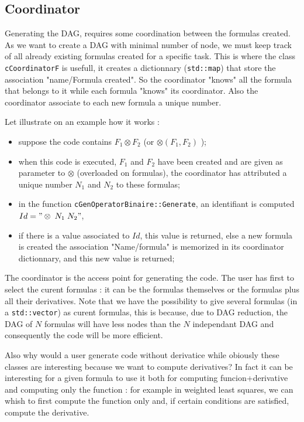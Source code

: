 
\subsection{Coordinator}

Generating the DAG, requires some coordination between the formulas created.
As we want to create a DAG with  minimal number of node, we must keep track
of all already existing formulas created for a specific task.
This is where the class {\tt cCoordinatorF} is usefull,  it creates a dictionnary ({\tt std::map})
that store the association "name/Formula created".  So the coordinator "knows" all the 
formula that belongs to it while each formula "knows" its coordinator. Also the coordinator
associate to each new formula a unique number.

Let illustrate on an example how it works :

\begin{itemize}
	\item  suppose the code contains  $F_1\otimes F_2$  (or  $\otimes(F_1,F_2)$ );
	\item  when this code is executed, $F_1$ and $F_2$ have been created and are given as
		parameter to $\otimes $ (overloaded on formulas), the coordinator has
		attributed a unique number $N_1$ and $N_2$ to these formulas;
	\item  in the function {\tt cGenOperatorBinaire::Generate}, an identifiant is computed $Id="\otimes \; N_1 \; N_2" $,
	\item  if there is a value associated to $Id$, this value is returned, else a new formula is created 
	       the association "Name/formula" is memorized in its coordinator dictionnary, and this new value is returned;
\end{itemize}

The coordinator  is the access point for generating the code. The user has first to select the curent formulas :
it can be the formulas themselves or the formulas plus all their derivatives.
Note that we have the possibility to give several formulas (in a {\tt std::vector}) as curent formulas,
this is because, due to DAG reduction,  the  DAG of $N$ formulas will have less nodes
than the $N$ independant DAG and consequently the code will be more efficient.

Also why would a user generate code without derivatice while
obiously these classes are interesting because we want to compute derivatives? 
In fact  it can be interesting for a given formula to use it both for  computing funcion+derivative and
computing  only the function : for example in weighted least squares, we can whish to first compute the function
only and, if certain conditions are satisfied, compute the derivative.

